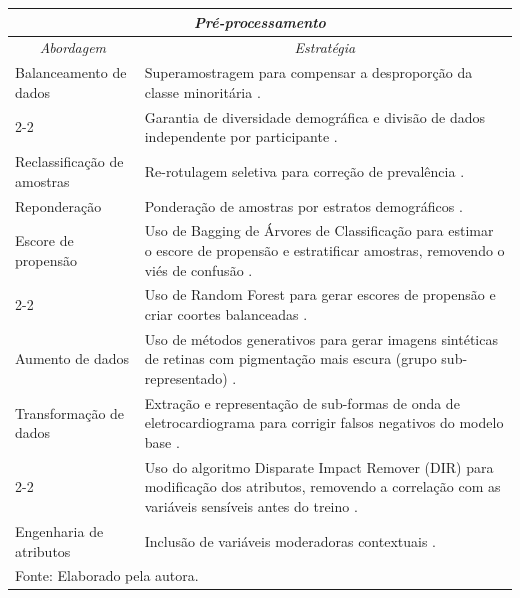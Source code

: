 \begin{longtable}{p{3cm}|p{11cm}}
\hline
\multicolumn{2}{c}{\textit{Pré-processamento}} \\ \hline
\multicolumn{1}{c|}{\textit{Abordagem}} & \multicolumn{1}{c}{\textit{Estratégia}} %
\\ \hline
Balanceamento de dados &
Superamostragem para compensar a desproporção da classe minoritária \cite{zarei2022machine}.\\
\cline{2-2}
& Garantia de diversidade demográfica e divisão de dados independente por participante \cite{han2022sounds}. \\
\hline
Reclassificação de amostras & Re-rotulagem seletiva para correção de prevalência \cite{seker2022preprocessing}. \\
\hline
Reponderação &
Ponderação de amostras por estratos demográficos \cite{allen2020racially}. \\
\hline
Escore de propensão & Uso de Bagging de Árvores de Classificação para estimar o escore de propensão e estratificar amostras, removendo o viés de confusão \cite{otok2020propensity}.\\
\cline{2-2}
& Uso de Random Forest para gerar escores de propensão e criar coortes balanceadas \cite{chandak2020using}.\\
\hline
Aumento de dados &
Uso de métodos generativos para gerar imagens sintéticas de retinas com pigmentação mais escura (grupo sub-representado) \cite{burlina2021addressing}. \\
\hline
Transformação de dados &
Extração e representação de sub-formas de onda de eletrocardiograma para corrigir falsos negativos do modelo base \cite{honarvar2022enhancing}. \\
\cline{2-2}
& Uso do algoritmo Disparate Impact Remover (DIR) para modificação dos atributos, removendo a correlação com as variáveis sensíveis antes do treino \cite{park2022fairness}. \\
\hline
Engenharia \newline de atributos & Inclusão de variáveis moderadoras contextuais \cite{cohen2022natural}. \\
\hline
\multicolumn{2}{l}{\small Fonte: Elaborado pela autora.} \\ %
\end{longtable}

\newpage


